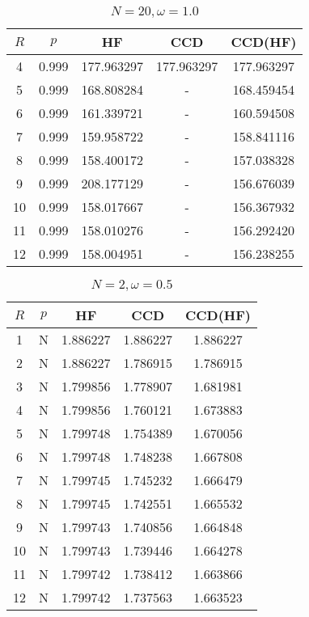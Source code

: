 \begin{table}[H]
    \centering
    \caption{$N = 20, \omega = 1.0$}
    \begin{tabular}{ccccc}
    \toprule
    $R$ & $p$ & HF & CCD & CCD(HF) \\
    \midrule
    4 & 0.999 & 177.963297 & 177.963297 & 177.963297 \\
    5 & 0.999 & 168.808284 & - & 168.459454 \\
    6 & 0.999 & 161.339721 & - & 160.594508 \\
    7 & 0.999 & 159.958722 & - & 158.841116 \\
    8 & 0.999 & 158.400172 & - & 157.038328 \\
    9 & 0.999 & 208.177129 & - & 156.676039 \\
    10 & 0.999 & 158.017667 & - & 156.367932 \\
    11 & 0.999 & 158.010276 & - & 156.292420 \\
    12 & 0.999 & 158.004951 & - & 156.238255 \\
    \bottomrule
    \end{tabular}
\end{table}

\begin{table}[H]
    \centering
    \caption{$N = 2, \omega = 0.5$}
    \begin{tabular}{ccccc}
    \toprule
    $R$ & $p$ & HF & CCD & CCD(HF) \\
    \midrule
    1 & N & 1.886227 & 1.886227 & 1.886227 \\
    2 & N & 1.886227 & 1.786915 & 1.786915 \\
    3 & N & 1.799856 & 1.778907 & 1.681981 \\
    4 & N & 1.799856 & 1.760121 & 1.673883 \\
    5 & N & 1.799748 & 1.754389 & 1.670056 \\
    6 & N & 1.799748 & 1.748238 & 1.667808 \\
    7 & N & 1.799745 & 1.745232 & 1.666479 \\
    8 & N & 1.799745 & 1.742551 & 1.665532 \\
    9 & N & 1.799743 & 1.740856 & 1.664848 \\
    10 & N & 1.799743 & 1.739446 & 1.664278 \\
    11 & N & 1.799742 & 1.738412 & 1.663866 \\
    12 & N & 1.799742 & 1.737563 & 1.663523 \\
    \bottomrule
    \end{tabular}
\end{table}

